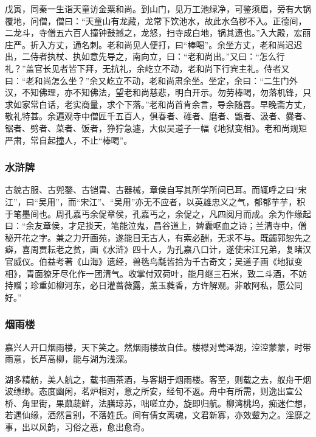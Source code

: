 \documentclass[]{article}
\begin{document}
戊寅，同秦一生诣天童访金粟和尚。到山门，见万工池绿净，可鉴须眉，旁有大锅覆地，问僧，僧曰：``天童山有龙藏，龙常下饮池水，故此水刍秽不入。正德间，二龙斗，寺僧五六百人撞钟鼓撼之，龙怒，扫寺成白地，锅其遗也。''入大殿，宏丽庄严。折入方丈，通名刺。老和尚见人便打，曰``棒喝''。余坐方丈，老和尚迟迟出，二侍者执杖、执如意先导之，南向立，曰：``老和尚出。''又曰：``怎么行礼？''盖官长见者皆下拜，无抗礼，余屹立不动，老和尚下行宾主礼。侍者又曰：``老和尚怎么坐？''余又屹立不动，老和尚肃余坐。坐定，余曰：``二生门外汉，不知佛理，亦不知佛法，望老和尚慈悲，明白开示。勿劳棒喝，勿落机锋，只求如家常白话，老实商量，求个下落。''老和尚首肯余言，导余随喜。早晚斋方丈，敬礼特甚。余遍观寺中僧匠千五百人，俱春者、碓者、磨者、甑者、汲者、爨者、锯者、劈者、菜者、饭者，狰狞急遽，大似吴道子一幅《地狱变相》。老和尚规矩严肃，常自起撞人，不止``棒喝''。

\hypertarget{header-n464}{%
\subsubsection{水浒牌}\label{header-n464}}

古貌古服、古兜鍪、古铠胄、古器械，章侯自写其所学所问已耳。而辄呼之曰``宋江''，曰``吴用''，而``宋江''、``吴用''亦无不应者，以英雄忠义之气，郁郁芋芋，积于笔墨间也。周孔嘉丐余促章侯，孔嘉丐之，余促之，凡四阅月而成。余为作缘起曰：``余友章侯，才足掞天，笔能泣鬼，昌谷道上，婢囊呕血之诗；兰清寺中，僧秘开花之字。兼之力开画苑，遂能目无古人，有索必酬，无求不与。既蠲郭恕先之癖，喜周贾耘老之贫，画《水浒》四十人，为孔嘉八口计，遂使宋江兄弟，复睹汉官威仪。伯益考著《山海》遗经，兽毨鸟氄皆拾为千古奇文；吴道子画《地狱变相》，青面獠牙尽化作一团清气。收掌付双荷叶，能月继三石米，致二斗酒，不妨持赠；珍重如柳河东，必日灌蔷薇露，薰玉蕤香，方许解观。非敢阿私，愿公同好。''

\hypertarget{header-n469}{%
\subsubsection{烟雨楼}\label{header-n469}}

嘉兴人开口烟雨楼，天下笑之。然烟雨楼故自佳。楼襟对莺泽湖，涳涳蒙蒙，时带雨意，长芦高柳，能与湖为浅深。

湖多精舫，美人航之，载书画茶酒，与客期于烟雨楼。客至，则载之去，舣舟干烟波缥缈。态度幽闲，茗炉相对，意之所安，经旬不返。舟中有所需，则逸出宣公桥、角里街，果蓏蔬鲜，法膳琼苏，咄嗟立办，旋即归航。柳湾桃坞，痴迷伫想，若遇仙缘，洒然言别，不落姓氏。间有倩女离魂，文君新寡，亦效颦为之。淫靡之事，出以风韵，习俗之恶，愈出愈奇。
\end{document}
